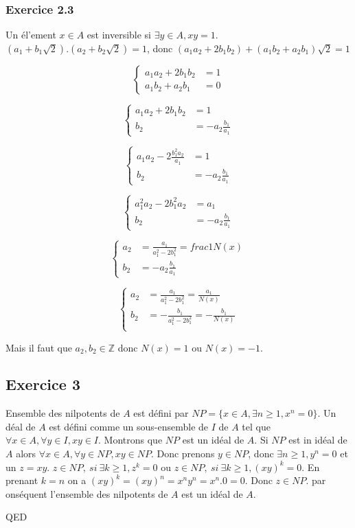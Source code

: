 \documentclass[]{book}
\theoremstyle{definition}
\newcommand{\bb}[1]{\mathbb{#1}}
\newcommand{\Z}{\bb{Z}}
\begin{document}
\subsubsection*{Exercice 2.3}
Un \'el'ement $x \in A$ est inversible si $\exists y \in A, xy = 1$. $(a_1+b_1\sqrt{2}).(a_2+b_2\sqrt{2}) = 1$, donc $(a_1a_2+2b_1b_2) + (a_1b_2+a_2b_1)\sqrt{2} = 1$

$$
\left\{ \begin{array}{ll}
a_1a_2+2b_1b_2 &= 1\\
a_1b_2+a_2b_1 &= 0
\end{array}
\right.
$$

$$
\left\{ \begin{array}{ll}
a_1a_2+2b_1b_2 &= 1\\
b_2 &= -a_2\frac{b_1}{a_1}
\end{array}
\right.
$$

$$
\left\{ \begin{array}{ll}
a_1a_2-2\frac{b_1^2a_2}{a_1} &= 1\\
b_2 &= -a_2\frac{b_1}{a_1}
\end{array}
\right.
$$

$$
\left\{ \begin{array}{ll}
a_1^2a_2-2b_1^2a_2 &= a_1\\
b_2 &= -a_2\frac{b_1}{a_1}
\end{array}
\right.
$$

$$
\left\{ \begin{array}{ll}
a_2 &= \frac{a_1}{a_1^2-2b_1^2} = frac{1}{N(x)}\\
b_2 &= -a_2\frac{b_1}{a_1}
\end{array}
\right.
$$

$$
\left\{ \begin{array}{ll}
a_2 &= \frac{a_1}{a_1^2-2b_1^2} = \frac{a_1}{N(x)}\\
b_2 &= -\frac{b_1}{a_1^2-2b_1^2} = -\frac{b_1}{N(x)}\\
\end{array}
\right.
$$

Mais il faut que $a_2, b_2 \in \Z$ donc $N(x) = 1$ ou $N(x) = -1$.

\subsection*{Exercice 3}
Ensemble des nilpotents de $A$ est d\'efini par $NP = \{x \in A, \exists n \geq 1, x^n = 0\}$. Un d\'eal de $A$ est d\'efini comme un sous-ensemble de $I$ de $A$ tel que $\forall x \in A, \forall y \in I, xy \in I$. Montrons que $NP$ est un id\'eal de $A$. Si $NP$ est in id\'eal de $A$ alors $\forall x \in A, \forall y \in NP, xy \in NP$. Donc prenons $y \in NP$, donc $\exists n \geq 1, y^n = 0$ et un $z=xy$. $z \in NP,\ si\ \exists k \geq 1, z^k = 0$ ou $z \in NP,\ si\ \exists k \geq 1, (xy)^k = 0$. En prenant $k=n$ on a $(xy)^k = (xy)^n = x^ny^n = x^n.0 = 0$. Donc $z \in NP$. par ons\'equent l'ensemble des nilpotents de $A$ est un id\'eal de $A$. 


QED
\end{document}
